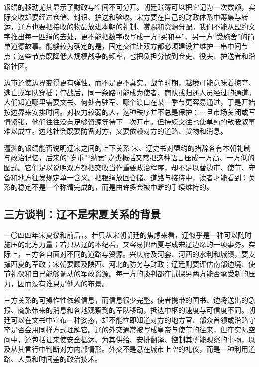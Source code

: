 银绢的移动尤其显示了财政与空间不可分开。朝廷账簿可以把它记为一次数额，实际交收却要经过仓储、封识、护送和验收。宋方要在自己的财政体系中筹集与转运，辽方也要把接收的物品放进本朝的礼制、赏赐和资源分配。我们不能从盟约文字推出每一匹绢的去处，更不能把数字改写成一方“买和平”、另一方“受施舍”的简单道德故事。能够较为确定的是，固定交往让双方都必须建设并维护一串中间节点；这些节点既降低大规模战争的频率，也把负担分散到仓吏、役夫、护送者和沿路社区。

边市还使边界变得更有弹性，而不是更不真实。战争时期，越境可能意味着掠夺、逃亡或军队穿插；停战后，同一条路可能成为使者、商队或归还人员经过的通道。人们知道哪里需要文书、何处有驻军、哪个渡口在某一季节更容易通过，于是开始按边界来安排时间。对权力较弱的人，这种秩序并不总是保护：一旦市场关闭或军情紧张，他们往往没有足够资源等待下一次开市。但持续交往也使单纯的敌我叙事难以成立。边地社会既要防备对方，又要依赖对方的道路、货物和消息。

\begin{debate}{澶渊的银绢能否说明辽宋之间的上下关系}
宋、辽史书对盟约的措辞各有本朝礼制与政治记忆，后来的“岁币”“纳贡”之类概括又常把这种语言压成一方高、一方低的图式。它们足以说明双方都把交收当作重要政治程序，却不足以替边市、使节、守备和地方征发规定单一含义。把银绢放回仓储、道路与接待中，读者才能看到：关系的稳定不是一个称谓完成的，而是由许多会被中断的手续维持的。
\end{debate}

\subsection{三方谈判：辽不是宋夏关系的背景}

一〇四四年宋夏议和前后，。若只从宋朝朝廷的焦虑来看，辽似乎是一种可以随时施压的北方力量；若只从辽的本纪看，又容易把西夏写成宋辽边缘的一项事务。实际上，三方各自面对不同的道路与资源。兴庆府及河套、河西的水利和城镇，要支撑西夏的军政；宋朝要顾及陕西、河北的防务与财政；辽廷则要评估南部边境、使节礼仪和自己能够调动的军政资源。每一方的谈判都在试探另两方能否承受新的压力，因而没有谁只是他人的布景。

三方关系的可操作性依赖信息，而信息很少完整。使者携带的国书、边将送出的急报、商旅带来的消息和各地观察到的军队移动，抵达中枢的速度与可信度不同。朝廷可以在文书中宣布一种姿态，却不能立即知道对方的地方官、部众首领或沿路守卒是否会用同样方式理解它。辽的外交通常被写成皇帝与使节的往来，但在实际空间中，还包括让来使安全抵达、为其供给、安排翻译、控制其所能观察的事物，以及从其言行中判断对方内部情形。外交不是悬在城市上空的礼仪，而是一种利用道路、人员和时间差的政治技术。

